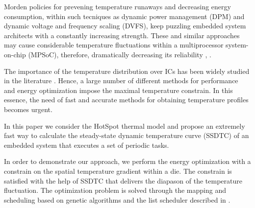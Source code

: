 Morden policies for prevening temperature runaways and decreasing energy consumption, within such tecniques as dynamic power management (DPM) and dynamic voltage and frequency scaling (DVFS), keep puzzling embedded system architects with a constantly increasing strength. These and similar approaches may cause considerable temperature fluctuations within a multiprocessor system-on-chip (MPSoC), therefore, dramatically decreasing its reliability \cite{mihic2004}, \cite{simunic2005}.

The importance of the temperature distribution over ICs has been widely studied in the literature \cite{lu2004}. Hence, a large number of different methods for performance and energy optimization impose the maximal temperature constrain. In this essence, the need of fast and accurate methods for obtaining temperature profiles becomes urgent.

In this paper we consider the HotSpot thermal model \cite{huang2006} and propose an extremely fast way to calculate the steady-state dynamic temperature curve (SSDTC) of an embedded system that executes a set of periodic tasks.

In order to demonstrate our approach, we perform the energy optimization with a constrain on the spatial temperature gradient within a die. The constrain is satisfied with the help of SSDTC that delivers the diapason of the temperature fluctuation. The optimization problem is solved through the mapping and scheduling based on genetic algorithms and the list scheduler described in \cite{schmitz2004}.
